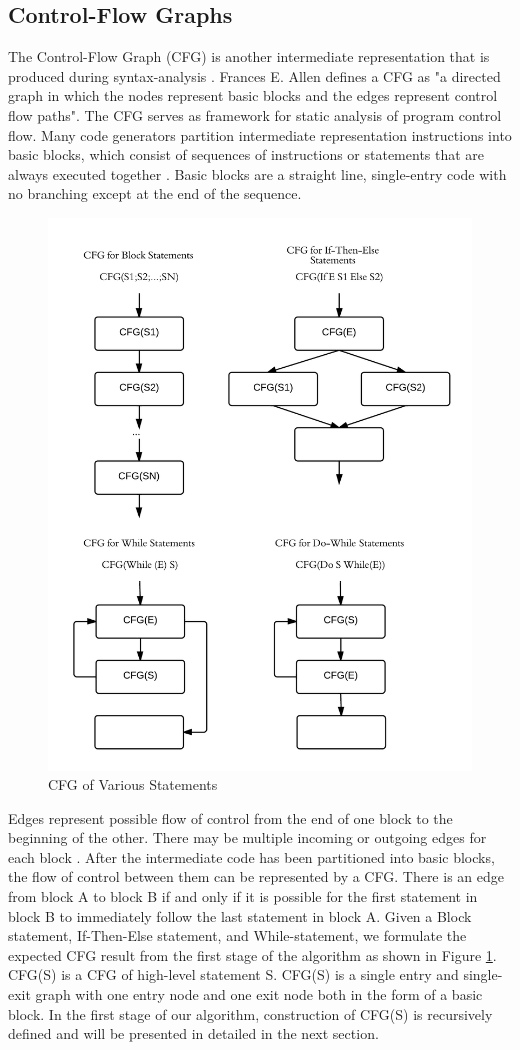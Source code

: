 \subsection{Control-Flow Graphs}
The Control-Flow Graph (CFG) is another intermediate representation that is produced during syntax-analysis . Frances E. Allen \cite{allen1970control} defines a CFG as "a directed graph in which the nodes represent basic blocks and the edges represent control flow paths". The CFG serves as framework for static analysis of program control flow. Many code generators partition intermediate representation instructions into basic blocks, which consist of sequences of instructions or statements that are always executed together \cite{lam2006compilers}. Basic blocks are a straight line, single-entry code with no branching except at the end of the sequence. 

\begin{figure}[h!]
\centering
\includegraphics[width=0.7\linewidth]{figures/Graph}
\caption{CFG of Various Statements}
\label{fig:Graph}
\end{figure}

Edges represent possible flow of control from the end of one block to the beginning of the other. There may be multiple incoming or outgoing edges for each block \cite{allen1970control}. After the intermediate code has been partitioned into basic blocks, the flow of control between them can be represented by a CFG. There is an edge from block A to block B if and only if it is possible for the first statement in block B to immediately follow the last statement in block A. Given a Block statement, If-Then-Else statement, and While-statement, we formulate the expected CFG result from the first stage of the algorithm as shown in Figure \ref{fig:Graph}. CFG(S) is a CFG of high-level statement S. CFG(S) is a single entry and single-exit graph with one entry node and one exit node both in the form of a basic block. In the first stage of our algorithm, construction of CFG(S) is recursively defined and will be presented in detailed in the next section. 

